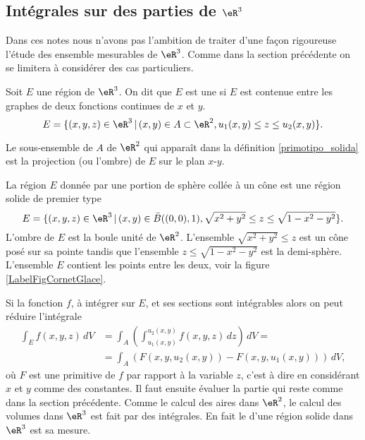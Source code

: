 \subsection{Intégrales sur des parties de $\eR^3$}
Dans ces notes nous n'avons pas l'ambition de traiter d'une façon rigoureuse l'étude des ensemble mesurables de $\eR^3$. Comme dans la section précédente on se limitera à considérer des cas particuliers. 
\begin{definition}\label{primotipo_solida}
	Soit $E$ une région de  $\eR^3$. On dit que $E$ est une  si $E$ est contenue entre les graphes de deux fonctions continues de $x$ et $y$.
\[
E=\{(x,y,z)\in\eR^3\, \vert \, (x,y)\in A\subset \eR^2, u_1(x,y)\leq z\leq u_2(x,y) \}. 
\]   
\end{definition}
Le sous-ensemble de $A$  de $\eR^2$ qui apparaît dans la définition \ref{primotipo_solida} est la projection (ou l'ombre) de $E$ sur le plan $x$-$y$. 
\begin{example}\label{cornet}
 La région $E$ donnée par une portion de sphère collée à un cône est une région solide de premier type
\[
E=\{(x,y,z)\in\eR^3\, \vert \, (x,y)\in \bar B((0,0),1), \sqrt{x^2+y^2}\leq z\leq \sqrt{1-x^2-y^2} \}. 
\]
L'ombre de $E$ est la boule unité de $\eR^2$. L'ensemble $\sqrt{x^2+y^2}\leq z$ est un cône posé sur sa pointe tandis que l'ensemble $z\leq\sqrt{ 1-x^2-y^2 }$ est la demi-sphère. L'ensemble $E$ contient les points entre les deux, voir la figure \ref{LabelFigCornetGlace}.
\newcommand{\CaptionFigCornetGlace}{Il faut voir ça en trois dimensions.}


\end{example}
Si la fonction $f$, à intégrer sur $E$, et ses sections sont intégrables  alors on peut réduire l'intégrale 
\begin{equation}
  \begin{aligned}
     \int_E  f(x,y,z)\, dV&=\int_A\left(\int_{u_1(x,y)}^{u_2(x,y)}f(x,y,z)\, dz \right) \, dV=\\
&=\int_A\left(F(x,y,u_2(x,y))-F(x,y,u_1(x,y))\right)\, dV,
  \end{aligned}
\end{equation}
où $F$ est une primitive de $f$ par rapport à la variable $z$, c'est à dire en considérant $x$ et $y$ comme des constantes. Il faut ensuite évaluer la partie qui reste comme dans la section précédente. Comme le calcul des aires  dans $\eR^2$, le calcul des volumes dans $\eR^3$ est fait par des intégrales. En fait le  d'une région solide dans $\eR^3$ est sa mesure. 
